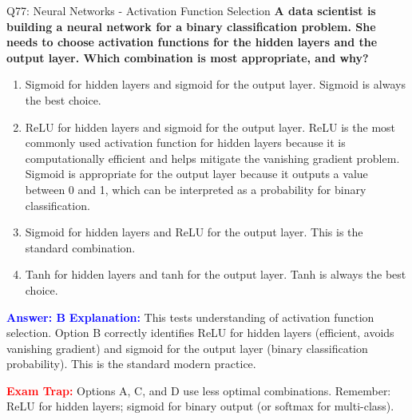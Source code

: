 \documentclass[8pt]{beamer}
\begin{document}
	\begin{frame}{Q77: Neural Networks - Activation Function Selection}
		\fontsize{6.5}{7.5}\selectfont
		\textbf{A data scientist is building a neural network for a binary classification problem. She needs to choose activation functions for the hidden layers and the output layer. Which combination is most appropriate, and why?}
		
		\begin{enumerate}
			\item Sigmoid for hidden layers and sigmoid for the output layer. Sigmoid is always the best choice.
			\item ReLU for hidden layers and sigmoid for the output layer. ReLU is the most commonly used activation function for hidden layers because it is computationally efficient and helps mitigate the vanishing gradient problem. Sigmoid is appropriate for the output layer because it outputs a value between 0 and 1, which can be interpreted as a probability for binary classification.
			\item Sigmoid for hidden layers and ReLU for the output layer. This is the standard combination.
			\item Tanh for hidden layers and tanh for the output layer. Tanh is always the best choice.
		\end{enumerate}
		
		\vspace{0.1cm}
		\textcolor{blue}{\textbf{Answer: B}}
		\vspace{0.1cm}
		\textcolor{blue}{\textbf{Explanation:}} This tests understanding of activation function selection. Option B correctly identifies ReLU for hidden layers (efficient, avoids vanishing gradient) and sigmoid for the output layer (binary classification probability). This is the standard modern practice.
		
		\textcolor{red}{\textbf{Exam Trap:}} Options A, C, and D use less optimal combinations. Remember: ReLU for hidden layers; sigmoid for binary output (or softmax for multi-class).
	\end{frame}
	
\end{document}

